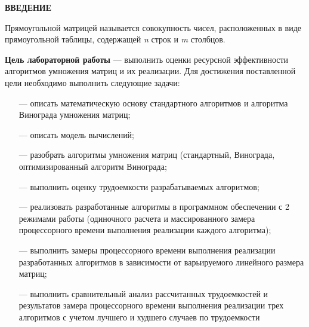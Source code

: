 \begin{center}
    \textbf{ВВЕДЕНИЕ}
\end{center}

Прямоугольной матрицей называется совокупность чисел, расположенных в виде прямоугольной таблицы, содержащей \textit{n} строк и \textit{m} столбцов.

\textbf{Цель лабораторной работы} --- выполнить оценки ресурсной эффективности алгоритмов умножения матриц и их реализации. Для достижения поставленной цели необходимо выполнить следующие задачи:

\begin{itemize}
	\item[---] описать математическую основу стандартного алгоритмов и алгоритма Винограда умножения матриц;
	\item[---] описать модель вычислений;
	\item[---] разобрать алгоритмы умножения матриц (стандартный, Винограда, оптимизированный алгоритм Винограда;
    \item[---] выполнить оценку трудоемкости разрабатываемых алгоритмов;
    \item[---] реализовать разработанные алгоритмы в программном обеспечении с 2 режимами работы (одиночного расчета и массированного замера процессорного времени выполнения реализации каждого алгоритма);
    \item[---] выполнить замеры процессорного времени выполнения реализации разработанных алгоритмов в зависимости от варьируемого линейного размера матриц;
    \item[---] выполнить сравнительный анализ рассчитанных трудоемкостей и результатов замера процессорного времени выполнения реализации трех алгоритмов с учетом лучшего и худшего случаев по трудоемкости
\end{itemize}